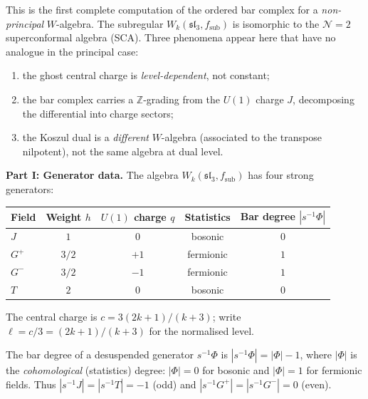 \begin{computation}
\label{comp:ordered-bar-n2-sca}

\providecommand{\Gp}{G^+}
\providecommand{\Gm}{G^-}
\providecommand{\wsl}{\widehat{\mathfrak{sl}}}

This is the first complete computation of the ordered bar
complex for a \emph{non-principal} $W$-algebra. The subregular
$W_k(\mathfrak{sl}_3,f_{\mathrm{sub}})$ is isomorphic to the
$\mathcal N=2$ superconformal algebra (SCA). Three phenomena
appear here that have no analogue in the principal case:
\begin{enumerate}[label=(\roman*)]
\item the ghost central charge is \emph{level-dependent},
not constant;
\item the bar complex carries a $\mathbb Z$-grading from the
$U(1)$ charge $J$, decomposing the differential into
charge sectors;
\item the Koszul dual is a \emph{different} $W$-algebra
(associated to the transpose nilpotent), not the same
algebra at dual level.
\end{enumerate}

\medskip
\noindent\textbf{Part I: Generator data.}
The algebra $W_k(\mathfrak{sl}_3,f_{\mathrm{sub}})$ has
four strong generators:
\begin{center}
\renewcommand{\arraystretch}{1.15}
\begin{tabular}{lcccc}
\textbf{Field} & \textbf{Weight $h$} & \textbf{$U(1)$ charge $q$}
& \textbf{Statistics} & \textbf{Bar degree $|s^{-1}\Phi|$} \\
\hline
$J$ & $1$ & $0$ & bosonic & $0$ \\
$\Gp$ & $3/2$ & $+1$ & fermionic & $1$ \\
$\Gm$ & $3/2$ & $-1$ & fermionic & $1$ \\
$T$ & $2$ & $0$ & bosonic & $0$
\end{tabular}
\end{center}
The central charge is $c = 3(2k+1)/(k+3)$; write
$\ell = c/3 = (2k+1)/(k+3)$ for the normalised level.

The bar degree of a desuspended generator $s^{-1}\Phi$ is
$|s^{-1}\Phi| = |\Phi| - 1$, where $|\Phi|$ is the
\emph{cohomological} (statistics) degree: $|\Phi|=0$ for
bosonic and $|\Phi|=1$ for fermionic fields. Thus
$|s^{-1}J| = |s^{-1}T| = -1$ (odd) and
$|s^{-1}\Gp| = |s^{-1}\Gm| = 0$ (even).


\end{computation}
